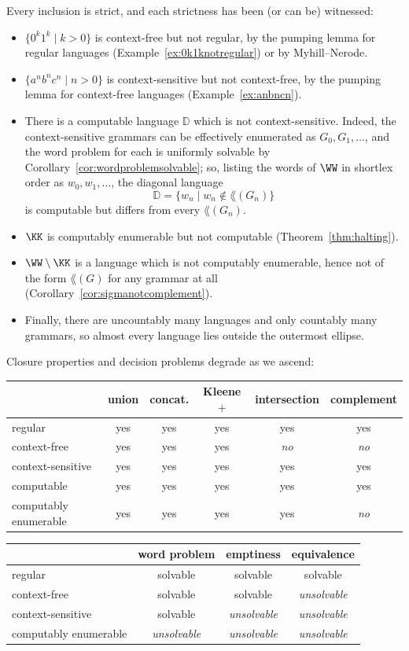 Every inclusion is strict, and each strictness has been (or can be) witnessed:
\begin{itemize}
	\item $\{0^k1^k \mid k > 0\}$ is context-free but not regular, by the pumping lemma for regular languages (Example~\ref{ex:0k1knotregular}) or by Myhill--Nerode.
	\item $\{a^nb^nc^n \mid n > 0\}$ is context-sensitive but not context-free, by the pumping lemma for context-free languages (Example~\ref{ex:anbncn}).
	\item There is a computable language $\mathbb{D}$ which is not context-sensitive. Indeed, the context-sensitive grammars can be effectively enumerated as $G_0, G_1, \dots$, and the word problem for each is uniformly solvable by Corollary~\ref{cor:wordproblemsolvable}; so, listing the words of $\WW$ in shortlex order as $w_0, w_1, \dots$, the diagonal language
	$$\mathbb{D} = \{w_n \mid w_n \notin \lang(G_n)\}$$
	is computable but differs from every $\lang(G_n)$.
	\item $\KK$ is computably enumerable but not computable (Theorem~\ref{thm:halting}).
	\item $\WW\setminus\KK$ is a language which is not computably enumerable, hence not of the form $\lang(G)$ for any grammar at all (Corollary~\ref{cor:sigmanotcomplement}).
	\item Finally, there are uncountably many languages and only countably many grammars, so almost every language lies outside the outermost ellipse.
\end{itemize}

Closure properties and decision problems degrade as we ascend:
\begin{center}
	\begin{tabular}{l|ccccc}
		 & union & concat. & Kleene $+$ & intersection & complement \\\hline
		regular & yes & yes & yes & yes & yes \\
		context-free & yes & yes & yes & \emph{no} & \emph{no} \\
		context-sensitive & yes & yes & yes & yes & yes \\
		computable & yes & yes & yes & yes & yes \\
		computably enumerable & yes & yes & yes & yes & \emph{no}
	\end{tabular}
\end{center}
\begin{center}
	\begin{tabular}{l|ccc}
		 & word problem & emptiness & equivalence \\\hline
		regular & solvable & solvable & solvable \\
		context-free & solvable & solvable & \emph{unsolvable} \\
		context-sensitive & solvable & \emph{unsolvable} & \emph{unsolvable} \\
		computably enumerable & \emph{unsolvable} & \emph{unsolvable} & \emph{unsolvable}
	\end{tabular}
\end{center}


